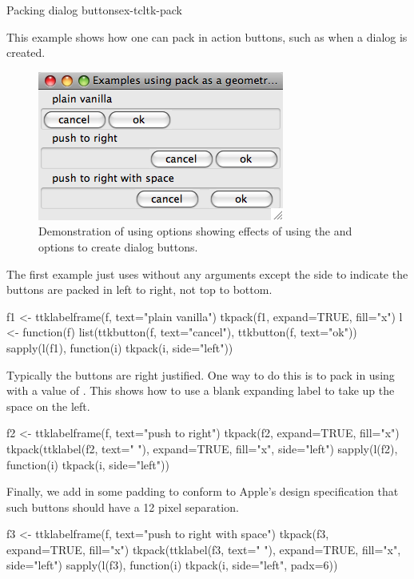 \begin{example}{Packing dialog buttons}{ex-tcltk-pack}


This example shows how one can pack in action buttons, such as when a
dialog is created.

\begin{figure}
  \centering
  \includegraphics[width=.5\textwidth]{fig-tcltk-pack-buttons.png}
  \caption{Demonstration of using  options showing
    effects of using the 
    and  options to create
    dialog buttons.}
  \label{fig:tcltk-pack-buttons}
\end{figure}


The first example just uses  without any arguments except
the side to indicate the buttons are packed in left to right, not top
to bottom.
\begin{Schunk}
\begin{Sinput}
 f1 <- ttklabelframe(f, text="plain vanilla")
 tkpack(f1, expand=TRUE, fill="x")
 l <- function(f) 
   list(ttkbutton(f, text="cancel"), ttkbutton(f, text="ok"))
 sapply(l(f1), function(i) tkpack(i, side="left"))
\end{Sinput}
\end{Schunk}

Typically the buttons are right justified. One way to do this is to
pack in using  with a value of . This shows
how to use a blank expanding label to take up the space on the left.
\begin{Schunk}
\begin{Sinput}
 f2 <- ttklabelframe(f, text="push to right")
 tkpack(f2, expand=TRUE, fill="x")
 tkpack(ttklabel(f2, text=" "), expand=TRUE, fill="x", side="left")
 sapply(l(f2), function(i) tkpack(i, side="left"))
\end{Sinput}
\end{Schunk}

Finally, we add in some padding to conform to Apple's design specification that such
buttons should have a 12 pixel separation.
\begin{Schunk}
\begin{Sinput}
 f3 <- ttklabelframe(f, text="push to right with space")
 tkpack(f3, expand=TRUE, fill="x")
 tkpack(ttklabel(f3, text=" "), expand=TRUE, fill="x", side="left")
 sapply(l(f3), function(i) tkpack(i, side="left", padx=6))
\end{Sinput}
\end{Schunk}
\end{example}

